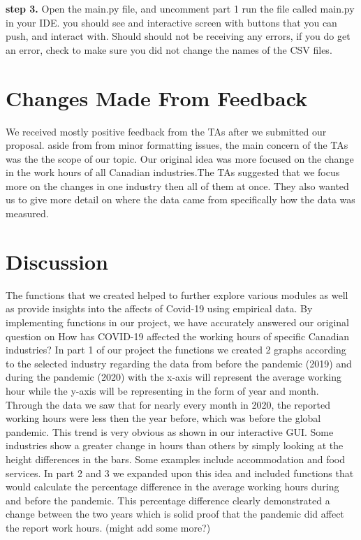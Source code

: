 \documentclass[fontsize=11pt]{article}
\begin{document}
\textbf{step 3.} Open the main.py file, and uncomment part 1
run the file called main.py in your IDE.
you should see and interactive screen with buttons that you can push, and interact with. Should should not be receiving any errors, if you do get an error, check to make sure you did not change the names of the CSV files.
 
\section*{Changes Made From Feedback}  

We received mostly positive feedback from the TAs after we submitted our proposal. aside from from minor formatting issues, the main concern of the TAs was the the scope of our topic. Our original idea was more focused on the change in the work hours of all Canadian industries.The TAs suggested that we focus more on the changes in one industry then all of them at once. They also wanted us to give more detail on where the data came from specifically how the data was measured.
 
 
 
 
 
\section*{Discussion} 

The functions that we created helped to further explore various modules as well as provide insights into the affects of Covid-19 using empirical data. By implementing functions in our project, we have accurately answered our original question on How has COVID-19 affected the working hours of specific Canadian industries? In part 1 of our project the functions we created 2 graphs according to the selected industry regarding the data
from before the pandemic (2019) and during the pandemic (2020) with the x-axis will represent the average working hour while the y-axis
will be representing in the form of year and month. Through the data we saw that for nearly every month in 2020, the reported working hours were less then the year before, which was before the global pandemic. This trend is very obvious as shown in our interactive GUI. Some industries show a greater change in hours than others by simply looking at the height differences in the bars. Some examples include accommodation and food services. In part 2 and 3 we expanded upon this idea and included functions that would calculate the percentage difference in the average working hours during and before the pandemic. This percentage difference clearly demonstrated a change between the two years which is solid proof that the pandemic did affect the report work hours.  (might add some more?)
\end{document}
